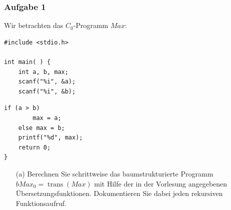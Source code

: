 \documentclass{beamer}
\DeclareMathOperator{\trans}{trans}
\begin{document}



\begin{frame}[fragile] \frametitle{Aufgabe 1}
	Wir betrachten das $C_0$-Programm $Max$:
	\begin{minipage}{\dimexpr0.5\linewidth-\fboxrule-\fboxsep}
		\begin{lstlisting}
#include <stdio.h>

int main( ) {
	int a, b, max;
	scanf("%i", &a);
	scanf("%i", &b);
		\end{lstlisting}
	\end{minipage}
	\begin{minipage}{\dimexpr0.5\linewidth-\fboxrule-\fboxsep}
		\begin{lstlisting}[firstnumber=7]
	if (a > b) 
		max = a;
	else max = b;
	printf("%d", max);
	return 0;
}
		\end{lstlisting}
	\end{minipage}

	\begin{itemize}
		\item[(a)] Berechnen Sie schrittweise das baumstrukturierte Programm $bMax_0 = \trans(Max)$ mit Hilfe der in der Vorlesung angegebenen Übersetzungsfunktionen. Dokumentieren Sie dabei jeden rekursiven Funktionsaufruf.
	\end{itemize}
\end{frame}
\end{document}
